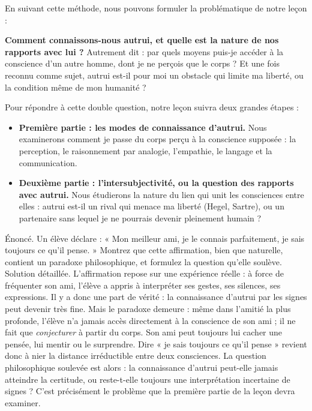 \documentclass[11pt]{article}
\begin{document}
En suivant cette méthode, nous pouvons formuler la problématique de notre leçon :

\begin{aretenir}
\textbf{Comment connaissons-nous autrui, et quelle est la nature de nos rapports avec lui ?} Autrement dit : par quels moyens puis-je accéder à la conscience d'un autre homme, dont je ne perçois que le corps ? Et une fois reconnu comme sujet, autrui est-il pour moi un obstacle qui limite ma liberté, ou la condition même de mon humanité ?
\end{aretenir}

Pour répondre à cette double question, notre leçon suivra deux grandes étapes :

\begin{itemize}
\item \textbf{Première partie : les modes de connaissance d'autrui.} Nous examinerons comment je passe du corps perçu à la conscience supposée : la perception, le raisonnement par analogie, l'empathie, le langage et la communication.
\item \textbf{Deuxième partie : l'intersubjectivité, ou la question des rapports avec autrui.} Nous étudierons la nature du lien qui unit les consciences entre elles : autrui est-il un rival qui menace ma liberté (Hegel, Sartre), ou un partenaire sans lequel je ne pourrais devenir pleinement humain ?
\end{itemize}

\begin{exoresolu}
Énoncé. Un élève déclare : « Mon meilleur ami, je le connais parfaitement, je sais toujours ce qu'il pense. » Montrez que cette affirmation, bien que naturelle, contient un paradoxe philosophique, et formulez la question qu'elle soulève.
\tcblower
Solution détaillée. L'affirmation repose sur une expérience réelle : à force de fréquenter son ami, l'élève a appris à interpréter ses gestes, ses silences, ses expressions. Il y a donc une part de vérité : la connaissance d'autrui par les signes peut devenir très fine. Mais le paradoxe demeure : même dans l'amitié la plus profonde, l'élève n'a jamais accès directement à la conscience de son ami ; il ne fait que \emph{conjecturer} à partir du corps. Son ami peut toujours lui cacher une pensée, lui mentir ou le surprendre. Dire « je sais toujours ce qu'il pense » revient donc à nier la distance irréductible entre deux consciences. La question philosophique soulevée est alors : la connaissance d'autrui peut-elle jamais atteindre la certitude, ou reste-t-elle toujours une interprétation incertaine de signes ? C'est précisément le problème que la première partie de la leçon devra examiner.
\end{exoresolu}
\end{document}
